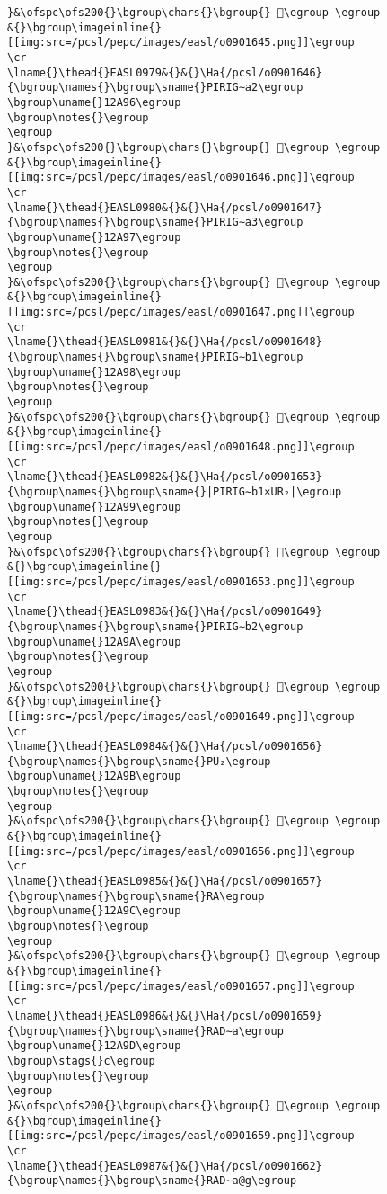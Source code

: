 \begin{verbatim}
}&\ofspc\ofs200{}\bgroup\chars{}\bgroup{} 𒪕\egroup \egroup
&{}\bgroup\imageinline{}[[img:src=/pcsl/pepc/images/easl/o0901645.png]]\egroup
\cr
\lname{}\thead{}EASL0979&{}&{}\Ha{/pcsl/o0901646}{\bgroup\names{}\bgroup\sname{}PIRIG∼a2\egroup
\bgroup\uname{}12A96\egroup
\bgroup\notes{}\egroup
\egroup
}&\ofspc\ofs200{}\bgroup\chars{}\bgroup{} 𒪖\egroup \egroup
&{}\bgroup\imageinline{}[[img:src=/pcsl/pepc/images/easl/o0901646.png]]\egroup
\cr
\lname{}\thead{}EASL0980&{}&{}\Ha{/pcsl/o0901647}{\bgroup\names{}\bgroup\sname{}PIRIG∼a3\egroup
\bgroup\uname{}12A97\egroup
\bgroup\notes{}\egroup
\egroup
}&\ofspc\ofs200{}\bgroup\chars{}\bgroup{} 𒪗\egroup \egroup
&{}\bgroup\imageinline{}[[img:src=/pcsl/pepc/images/easl/o0901647.png]]\egroup
\cr
\lname{}\thead{}EASL0981&{}&{}\Ha{/pcsl/o0901648}{\bgroup\names{}\bgroup\sname{}PIRIG∼b1\egroup
\bgroup\uname{}12A98\egroup
\bgroup\notes{}\egroup
\egroup
}&\ofspc\ofs200{}\bgroup\chars{}\bgroup{} 𒪘\egroup \egroup
&{}\bgroup\imageinline{}[[img:src=/pcsl/pepc/images/easl/o0901648.png]]\egroup
\cr
\lname{}\thead{}EASL0982&{}&{}\Ha{/pcsl/o0901653}{\bgroup\names{}\bgroup\sname{}|PIRIG∼b1×UR₂|\egroup
\bgroup\uname{}12A99\egroup
\bgroup\notes{}\egroup
\egroup
}&\ofspc\ofs200{}\bgroup\chars{}\bgroup{} 𒪙\egroup \egroup
&{}\bgroup\imageinline{}[[img:src=/pcsl/pepc/images/easl/o0901653.png]]\egroup
\cr
\lname{}\thead{}EASL0983&{}&{}\Ha{/pcsl/o0901649}{\bgroup\names{}\bgroup\sname{}PIRIG∼b2\egroup
\bgroup\uname{}12A9A\egroup
\bgroup\notes{}\egroup
\egroup
}&\ofspc\ofs200{}\bgroup\chars{}\bgroup{} 𒪚\egroup \egroup
&{}\bgroup\imageinline{}[[img:src=/pcsl/pepc/images/easl/o0901649.png]]\egroup
\cr
\lname{}\thead{}EASL0984&{}&{}\Ha{/pcsl/o0901656}{\bgroup\names{}\bgroup\sname{}PU₂\egroup
\bgroup\uname{}12A9B\egroup
\bgroup\notes{}\egroup
\egroup
}&\ofspc\ofs200{}\bgroup\chars{}\bgroup{} 𒪛\egroup \egroup
&{}\bgroup\imageinline{}[[img:src=/pcsl/pepc/images/easl/o0901656.png]]\egroup
\cr
\lname{}\thead{}EASL0985&{}&{}\Ha{/pcsl/o0901657}{\bgroup\names{}\bgroup\sname{}RA\egroup
\bgroup\uname{}12A9C\egroup
\bgroup\notes{}\egroup
\egroup
}&\ofspc\ofs200{}\bgroup\chars{}\bgroup{} 𒪜\egroup \egroup
&{}\bgroup\imageinline{}[[img:src=/pcsl/pepc/images/easl/o0901657.png]]\egroup
\cr
\lname{}\thead{}EASL0986&{}&{}\Ha{/pcsl/o0901659}{\bgroup\names{}\bgroup\sname{}RAD∼a\egroup
\bgroup\uname{}12A9D\egroup
\bgroup\stags{}c\egroup
\bgroup\notes{}\egroup
\egroup
}&\ofspc\ofs200{}\bgroup\chars{}\bgroup{} 𒪝\egroup \egroup
&{}\bgroup\imageinline{}[[img:src=/pcsl/pepc/images/easl/o0901659.png]]\egroup
\cr
\lname{}\thead{}EASL0987&{}&{}\Ha{/pcsl/o0901662}{\bgroup\names{}\bgroup\sname{}RAD∼a@g\egroup

\end{verbatim}
